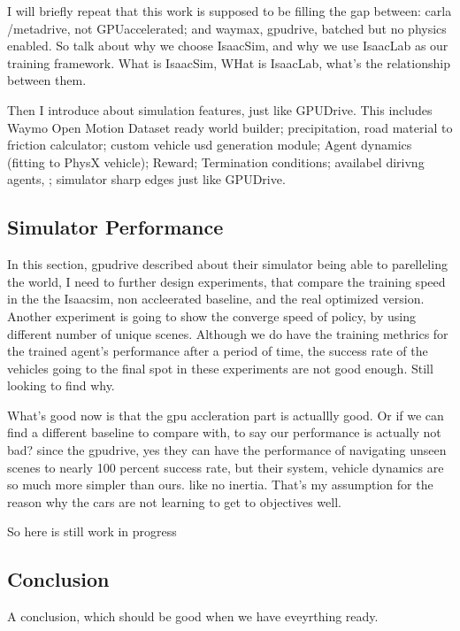I will briefly repeat that this work is supposed to be filling the gap between: carla /metadrive, not GPUaccelerated; and waymax, gpudrive, batched but no physics enabled. So talk about why we choose IsaacSim, and why we use IsaacLab as our training framework. What is IsaacSim, WHat is IsaacLab, what's the relationship between them. 

Then I introduce about simulation features, just like GPUDrive. This includes Waymo Open Motion Dataset ready world builder; precipitation, road material to friction calculator; custom vehicle usd generation module; Agent dynamics (fitting to PhysX vehicle); Reward; Termination conditions; availabel dirivng agents, ; simulator sharp edges just like GPUDrive.

\subsection{Simulator Performance}
In this section, gpudrive described about their simulator being able to parelleling the world, I need to further design experiments, that compare the training speed in the the Isaacsim, non accleerated baseline, and the real optimized version. Another experiment is going to show the converge speed of policy, by using different number of unique scenes. Although we do have the training methrics for the trained agent's performance after a period of time, the success rate of the vehicles going to the final spot in these experiments are not 
good enough. Still looking to find why. 

What's good now is that the gpu accleration part is actuallly good. Or if we can find a different baseline to compare with, to say our performance is actually not bad? since the gpudrive, yes they can have the performance of navigating unseen scenes to nearly 100 percent  success rate, but their system, vehicle dynamics are so much more simpler than ours. like no inertia. That's my assumption for the reason why the cars are not learning to get to objectives well.

So here is still work in progress
\subsection{Conclusion}

A conclusion, which should be good when we have eveyrthing ready.